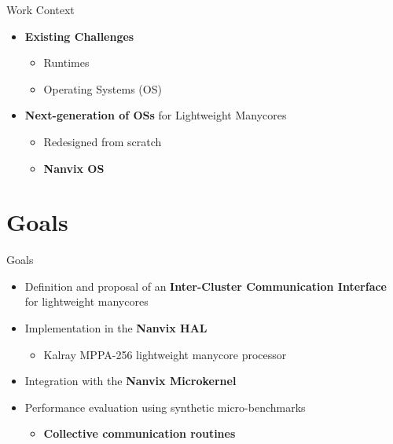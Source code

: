 	\begin{frame}[fragile]{Work Context}
		\begin{itemize}
			\item \textbf{Existing Challenges} %
			\begin{itemize}
				\item Runtimes
				\item Operating Systems (OS)
			\end{itemize}
			\item \textbf{Next-generation of OSs} for Lightweight Manycores
			\begin{itemize}
				\item Redesigned from scratch
				\item \textbf{Nanvix OS}
			\end{itemize}
		\end{itemize}
	\end{frame}

\section{Goals}

	\begin{frame}[fragile]{Goals}
		\begin{itemize}
			\item Definition and proposal of an \textbf{Inter-Cluster Communication Interface} for lightweight manycores
			\item Implementation in the \textbf{Nanvix HAL}
			\begin{itemize}
				\item Kalray MPPA-256 lightweight manycore processor
			\end{itemize}
			\item Integration with the \textbf{Nanvix Microkernel}
			\item Performance evaluation using synthetic micro-benchmarks
			\begin{itemize}
				\item \textbf{Collective communication routines}
			\end{itemize}
		\end{itemize}
	\end{frame}

